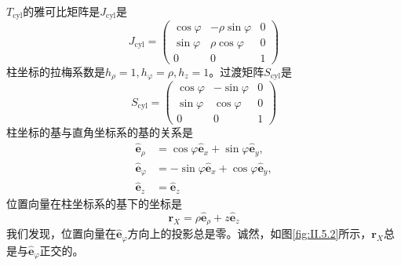 \documentclass[../main.tex]{subfiles}
\begin{document}
\begin{example}[柱坐标系和球坐标系的基]\label{exp:II.5.2}
    $T_\mathrm{cyl}$的雅可比矩阵是$J_\mathrm{cyl}$是
    \[
        J_\mathrm{cyl}=\left(\begin{array}{ccc}
                \cos\varphi & -\rho\sin\varphi & 0 \\
                \sin\varphi & \rho\cos\varphi  & 0 \\
                0           & 0                & 1
            \end{array}\right)
    \]
    柱坐标的拉梅系数是$h_\rho=1,h_\varphi=\rho,h_z=1$。过渡矩阵$S_\mathrm{cyl}$是
    \[
        S_\mathrm{cyl}=\left(\begin{array}{ccc}\cos\varphi & -\sin\varphi & 0 \\
             \sin\varphi      & \cos\varphi  & 0 \\
             0                & 0            & 1\end{array}\right)
    \]
    柱坐标的基与直角坐标系的基的关系是
    \[
        \begin{aligned}
            \mathbf{\hat{e}}_\rho    & =\cos\varphi\mathbf{\hat{e}}_x+\sin\varphi\mathbf{\hat{e}}_y,  \\
            \mathbf{\hat{e}}_\varphi & =-\sin\varphi\mathbf{\hat{e}}_x+\cos\varphi\mathbf{\hat{e}}_y, \\
            \mathbf{\hat{e}}_z       & =\mathbf{\hat{e}}_z
        \end{aligned}
    \]
    位置向量在柱坐标系的基下的坐标是
    \[\mathbf{r}_X=\rho\mathbf{\hat{e}}_\rho+z\mathbf{\hat{e}}_z\]
    我们发现，位置向量在$\mathbf{\hat{e}}_\varphi$方向上的投影总是零。诚然，如图\ref{fig:II.5.2}所示，$\mathbf{r}_X$总是与$\mathbf{\hat{e}}_\varphi$正交的。


\end{example}
\end{document}

